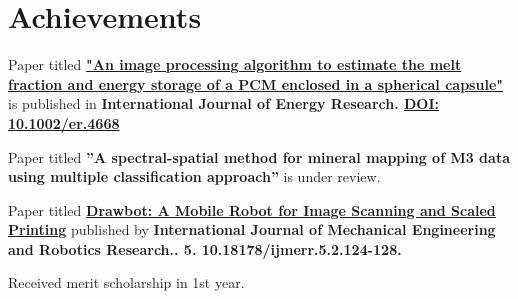 \documentclass[]{deedy-resume-openfont}
\begin{document}
\begin{minipage}[t]{0.66\textwidth}
\section{Achievements} 
\vspace{\topsep}
\begin{tightemize}
\item Paper titled \textbf{\href{https://onlinelibrary.wiley.com/doi/10.1002/er.4668}{"An image processing algorithm to estimate the melt fraction and energy storage of a PCM enclosed in a spherical capsule"}} is published in \textbf{International Journal of Energy Research. \href{https://onlinelibrary.wiley.com/doi/10.1002/er.4668}{DOI: 10.1002/er.4668}}
\item Paper titled \textbf{”A spectral-spatial method for mineral mapping of M3 data using multiple classification approach”} is under review.
\item Paper titled \textbf{\href{https://www.researchgate.net/publication/310812213_Drawbot_A_Mobile_Robot_for_Image_Scanning_and_Scaled_Printing}{Drawbot: A Mobile Robot for Image Scanning and Scaled Printing}} published by \textbf{International Journal of Mechanical Engineering and Robotics Research.. 5. 10.18178/ijmerr.5.2.124-128.}
\item Received merit scholarship in 1st year.
\end{tightemize}
\sectionsep
\end{minipage}
\end{document}
